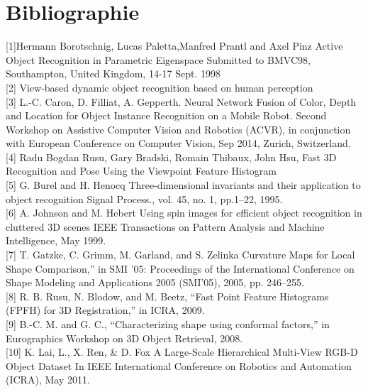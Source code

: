 \chapter{Bibliographie}

[1]Hermann Borotschnig, Lucas Paletta,Manfred Prantl and Axel Pinz 
Active Object Recognition in Parametric Eigenspace 
Submitted to BMVC98, Southampton, United Kingdom, 14-17 Sept. 1998 \\

[2] View-based dynamic object recognition based on human perception \\

[3] L.-C. Caron, D. Filliat, A. Gepperth.
Neural Network Fusion of Color, Depth and Location for Object Instance Recognition on a Mobile Robot. 
Second Workshop on Assistive Computer Vision and Robotics (ACVR), in conjunction with European Conference on Computer Vision, Sep 2014, Zurich, Switzerland.\\

[4] Radu Bogdan Rusu, Gary Bradski, Romain Thibaux, John Hsu,
Fast 3D Recognition and Pose Using the Viewpoint Feature Histogram \\

[5] G. Burel and H. Henocq
Three-dimensional invariants and their application to object recognition
Signal Process., vol. 45, no. 1, pp.1–22, 1995. \\

[6] A. Johnson and M. Hebert
Using spin images for efficient object recognition in cluttered 3D scenes
IEEE Transactions on Pattern Analysis and Machine Intelligence, May 1999. \\

[7] T. Gatzke, C. Grimm, M. Garland, and S. Zelinka 
Curvature Maps for Local Shape Comparison,” 
in SMI ’05: Proceedings of the International Conference on Shape Modeling and Applications 2005 (SMI’05), 2005, pp. 246–255. \\

[8] R. B. Rusu, N. Blodow, and M. Beetz, “Fast Point Feature Histograms
(FPFH) for 3D Registration,” in ICRA, 2009. \\

[9] B.-C. M. and G. C., “Characterizing shape using conformal factors,”
in Eurographics Workshop on 3D Object Retrieval, 2008. \\

[10] K. Lai, L., X. Ren, \& D. Fox  A Large-Scale Hierarchical Multi-View RGB-D Object Dataset In IEEE International Conference on Robotics and Automation (ICRA), May 2011. \\

